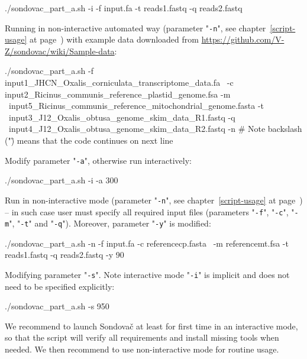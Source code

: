 \documentclass[a4paper, 11pt, twoside]{article}
\begin{document}
\begin{bashcode}
  ./sondovac_part_a.sh -i -f input.fa -t reads1.fastq -q reads2.fastq
\end{bashcode}

Running in non-interactive automated way (parameter "\texttt{-n}", see chapter~\ref{script-usage} at page~\pageref{script-usage}) with 
example data downloaded from \href{https://github.com/V-Z/sondovac/wiki/Sample-data}{https://github.com/V-Z/sondovac/wiki/Sample-data}:

\begin{bashcode}
  ./sondovac_part_a.sh -f input1_JHCN_Oxalis_corniculata_transcriptome_data.fa \
    -c input2_Ricinus_communis_reference_plastid_genome.fsa -m \
    input5_Ricinus_communis_reference_mitochondrial_genome.fasta -t \
    input3_J12_Oxalis_obtusa_genome_skim_data_R1.fastq -q \
    input4_J12_Oxalis_obtusa_genome_skim_data_R2.fastq -n
  # Note backslash ("\") means that the code continues on next line
\end{bashcode}

Modify parameter "\texttt{-a}", otherwise run interactively:

\begin{bashcode}
  ./sondovac_part_a.sh -i -a 300
\end{bashcode}

Run in non-interactive mode (parameter "\texttt{-n}", see chapter~\ref{script-usage} at page~\pageref{script-usage}) -- in such case user must specify all required input files (parameters "\texttt{-f}", "\texttt{-c}", "\texttt{-m}", "\texttt{-t}" and "\texttt{-q}"). Moreover, parameter "\texttt{-y}" is modified:

\begin{bashcode}
  ./sondovac_part_a.sh -n -f input.fa -c referencecp.fasta \
    -m referencemt.fsa -t reads1.fastq -q reads2.fastq -y 90
\end{bashcode}

Modifying parameter "\texttt{-s}". Note interactive mode "\texttt{-i}" is implicit and does not need to be specified explicitly:

\begin{bashcode}
  ./sondovac_part_a.sh -s 950
\end{bashcode}

We recommend to launch Sondovač at least for first time in an interactive mode, so that the script will verify all requirements and install missing tools when needed. We then recommend to use non-interactive mode for routine usage.
\end{document}
